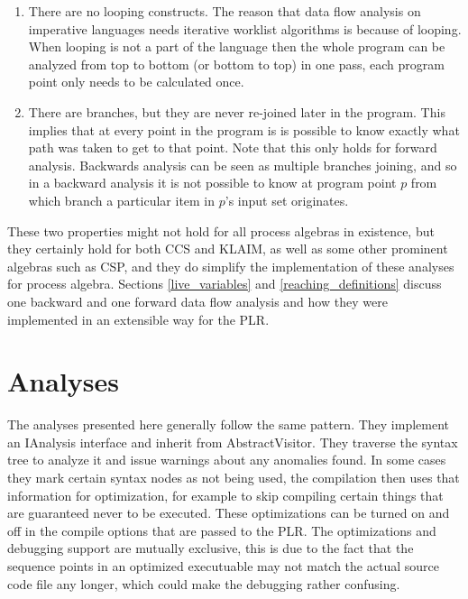 	\begin{enumerate}
		\item There are no looping constructs. The reason that data flow analysis 
		on imperative languages needs iterative worklist algorithms is because of 
		looping. When looping is not a part of the language then the whole program 
		can be analyzed from top to bottom (or bottom to top) in one pass, each 
		program point only needs to be calculated once.
		
		\item There are branches, but they are never re-joined later in the 
		program. This implies that at every point in the program is is possible to 
		know exactly what path was taken to get to that point. Note that this only 
		holds for forward analysis. Backwards analysis can be seen as multiple 
		branches joining, and so in a backward analysis it is not possible to know 
		at program point $p$ from which branch a particular item in $p$'s input 
		set originates.
		
	\end{enumerate}

	These two properties might not hold for all process algebras in existence, 
	but they certainly hold for both CCS and KLAIM, as well as some other 
	prominent algebras such as CSP, and they do simplify the implementation of 
	these analyses for process algebra. Sections \ref{live_variables} and 
	\ref{reaching_definitions} discuss one backward and one forward data flow 
	analysis and how they were implemented in an extensible way for the PLR.
	
\section{Analyses}
	
	The analyses presented here generally follow the same pattern. They implement
	an \textsf{IAnalysis} interface and inherit from \textsf{AbstractVisitor}. 
	They traverse the syntax tree to analyze it and issue warnings about any
	anomalies found. In some cases they mark certain syntax nodes as not being
	used, the compilation then uses that information for optimization, for 
	example to skip compiling certain things that are guaranteed never to be 
	executed. These optimizations can be turned on and off in the compile 
	options that are passed to the PLR. The optimizations and debugging support 
	are mutually exclusive, this is due to the fact that the sequence points in 
	an optimized executuable may not match the actual source code file any 
	longer, which could make the debugging rather confusing.
	
